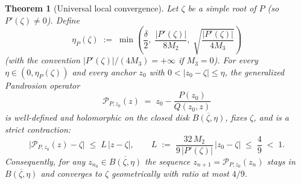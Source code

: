 \documentclass[10pt,a4paper,oneside]{book}
\newtheorem{theorem}{Theorem}[chapter]
\theoremstyle{definition}
\theoremstyle{remark}
\begin{document}
\begin{theorem}[Universal local convergence]
\label{thm:universal_local}
Let $\zeta$ be a simple root of $P$ (so $P'(\zeta) \neq 0$).  Define
\begin{equation}
  \label{eq:eta_def}
  \eta_P(\zeta) \;:=\; \min\!\left(\frac{\delta}{2},\; \frac{|P'(\zeta)|}{8 M_2},\; \sqrt{\frac{|P'(\zeta)|}{4 M_3}}\right)
\end{equation}
(with the convention $|P'(\zeta)|/(4M_3) = +\infty$ if $M_3 = 0$).  For every $\eta \in (0, \eta_P(\zeta))$ and every anchor $z_0$ with $0 < |z_0 - \zeta| \leq \eta$, the generalized Pandrosion operator
\[
  \mathcal{P}_{P,z_0}(z) \;=\; z_0 - \frac{P(z_0)}{Q(z_0, z)}
\]
is well-defined and holomorphic on the closed disk $\overline{B(\zeta, \eta)}$, fixes $\zeta$, and is a strict contraction:
\begin{equation}
  \label{eq:contraction_bound}
  \bigl|\mathcal{P}_{P,z_0}(z) - \zeta\bigr|
  \;\leq\;
  L\,|z - \zeta|,
  \qquad
  L \;:=\; \frac{32\, M_2}{9\,|P'(\zeta)|}\,|z_0 - \zeta| \;\leq\; \frac{4}{9} \;<\; 1.
\end{equation}
Consequently, for any $z_{n_0} \in \overline{B(\zeta, \eta)}$ the sequence $z_{n+1} = \mathcal{P}_{P,z_0}(z_n)$ stays in $\overline{B(\zeta, \eta)}$ and converges to $\zeta$ geometrically with ratio at most $4/9$.
\end{theorem}
\end{document}
